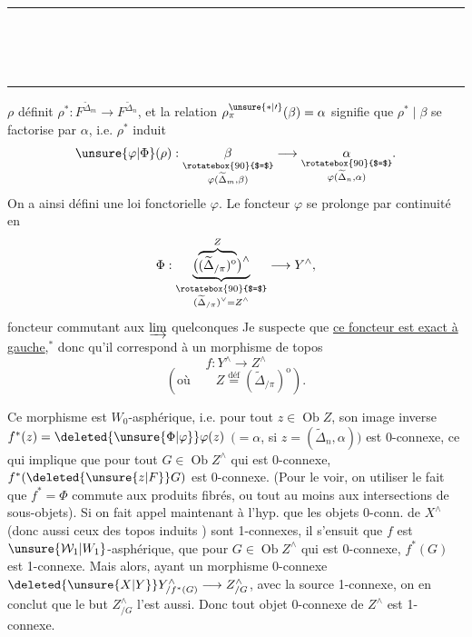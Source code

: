 \begin{center}
\\
\rule{4em}{0.4pt}\\
\\
\\
\rule{1.6em}{0.4pt}
\end{center}
$\rho$ définit $\rho^*:F^{\widetilde\Delta_m}\longrightarrow F^{\widetilde\Delta_n}$, et la relation $\rho_\pi^{\unsure{*|\prime}}(\beta)=\alpha$ signifie que $\rho^*\mid\beta$ se factorise par $\alpha$, i.e. $\rho^*$ induit
\[
 \unsure{\varphi|\Phi}(\rho):
 \underset{\substack{\rotatebox{90}{$=$}\\\varphi(\widetilde\Delta_m,\beta)}}{\beta}\longrightarrow
 \underset{\substack{\rotatebox{90}{$=$}\\\varphi(\widetilde\Delta_n,\alpha)}}{\alpha}.
\]
On a ainsi défini une loi fonctorielle $\varphi$. Le foncteur $\varphi$ se prolonge par continuité en
\[
 \Phi:\underbrace{\bigl(\overbrace{(\widetilde\Delta_{/\pi})^{\mathrm o}}^{Z}\bigr)^\wedge}
 _{\substack{\rotatebox{90}{$=$}\\(\widetilde\Delta_{/\pi})^\vee=Z^\wedge}}
 \longrightarrow Y^\wedge,
\]
foncteur commutant aux $\varinjlim$ quelconques
Je suspecte que \uline{ce foncteur est exact à gauche},$^*$ donc qu'il correspond à un morphisme de topos
\[
 f:Y^\wedge\longrightarrow Z^\wedge
\]
\[
 (\text{où}\qquad Z\overset{\text{déf}}{=}(\widetilde\Delta_{/\pi})^{\mathrm o}).
\]

Ce morphisme est $W_0$-asphérique, i.e. pour tout $z\in\operatorname{Ob}Z$, son image inverse $f^*(z)=\deleted{\unsure{\Phi|\varphi}}\varphi(z)$ $(=\alpha$, si $z=(\widetilde\Delta_n,\alpha))$ est 0-connexe, ce qui implique que pour tout $G\in\operatorname{Ob}Z^\wedge$ qui est 0-connexe, \deleted{$\unsure{\Phi|\varphi}$} $f^*(\deleted{\unsure{z|F}}G)$ est 0-connexe. (Pour le voir, on  utiliser le fait que $f^*=\Phi$ commute aux produits fibrés, ou tout au moins aux intersections de sous-objets).
Si on fait appel maintenant à l'hyp. que les objets 0-conn. de $X^\wedge$ (donc aussi ceux des topos induits ) sont 1-connexes, il s'ensuit que $f$ est  $\unsure{\mathcal W_1|W_1}$-asphérique,   que pour   $G\in\operatorname{Ob}Z^\wedge$ qui est 0-connexe, $f^*(G)$ est 1-connexe.
Mais alors, ayant un morphisme 0-connexe $\deleted{\unsure{X|Y}}Y^\wedge_{/f^*(G)}\longrightarrow Z^\wedge_{/G}$, avec la source 1-connexe, on en conclut que le but $Z^\wedge_{/G}$ l'est aussi. Donc tout objet 0-connexe de $Z^\wedge$ est 1-connexe.

